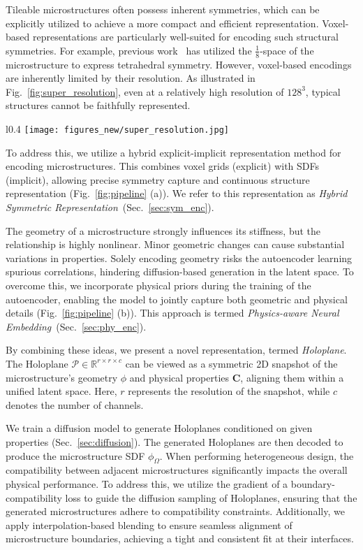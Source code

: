 Tileable microstructures often possess inherent symmetries, which can be explicitly utilized to achieve a more compact and efficient representation.
Voxel-based representations are particularly well-suited for encoding such structural symmetries.
For example, previous work~\cite{Yang2024} has utilized the $\frac{1}{8}$-space of the microstructure to express tetrahedral symmetry. 
However, voxel-based encodings are inherently limited by their resolution.
As illustrated in Fig.~\ref{fig:super_resolution}, even at a relatively high resolution of $128^3$, typical structures cannot be faithfully represented.

\begin{wrapfigure}{l}{0.4\linewidth}
    \centering
    \setlength{\columnsep}{5pt} 
    \setlength{\intextsep}{5pt} 
    \texttt{[image: figures\_new/super\_resolution.jpg]}
    \caption{Left: Resolution 128, Right: Super-resolution 196.
    }
	\label{fig:super_resolution}
\end{wrapfigure}
To address this, we utilize a hybrid explicit-implicit representation method for encoding microstructures. 
This combines voxel grids (explicit) with SDFs (implicit), allowing precise symmetry capture and continuous structure representation (Fig.~\ref{fig:pipeline} (a)).
We refer to this representation as \textit{Hybrid Symmetric Representation}~(Sec.~\ref{sec:sym_enc}).

The geometry of a microstructure strongly influences its stiffness, but the relationship is highly 
 nonlinear. 
Minor geometric changes can cause substantial variations in properties.
Solely encoding geometry risks the autoencoder learning spurious correlations, hindering diffusion-based generation in the latent space.
To overcome this, we incorporate physical priors during the training of the autoencoder, enabling the model to jointly capture both geometric and physical details (Fig.~\ref{fig:pipeline} (b)).
This approach is termed \textit{Physics-aware Neural Embedding}~(Sec.~\ref{sec:phy_enc}).

By combining these ideas, we present a novel representation, termed \textit{Holoplane}.
The Holoplane $\mathcal{P} \in \mathbb{R}^{r\times r\times c}$ can be viewed as a symmetric 2D snapshot of the microstructure’s geometry $\phi$ and physical properties $\mathbf{C}$, aligning them within a unified latent space. Here, $r$ represents the resolution of the snapshot, while $c$ denotes the number of channels.


We train a diffusion model to generate Holoplanes conditioned on given properties (Sec.~\ref{sec:diffusion}). 
The generated Holoplanes are then decoded to produce the microstructure SDF $\phi_{\Omega}$.
When performing heterogeneous design, the compatibility between adjacent microstructures significantly impacts the overall physical performance.
To address this, we utilize the gradient of a boundary-compatibility loss to guide the diffusion sampling of Holoplanes, ensuring that the generated microstructures adhere to compatibility constraints.
Additionally, we apply interpolation-based blending to ensure seamless alignment of microstructure boundaries, achieving a tight and consistent fit at their interfaces.
